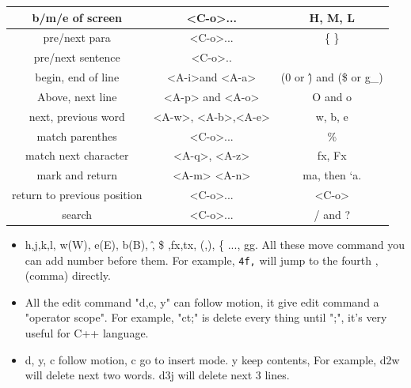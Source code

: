 \documentclass[a4paper,12pt,twoside]{book}
\begin{document}
\begin{itemize}
\begin{center}
\begin{tabular}{c|c|c}
	    \hline 
		b/m/e of screen & <C-o>... & H, M, L \\

		\hline 
		pre/next para & <C-o>... &\{ \} \\

		\hline 

		pre/next sentence & <C-o>.. & \( \) \\
		
		\hline 
		begin, end of line &<A-i>and <A-a> & (0 or \^) and (\$ or g\_)  \\
		

        \hline 
        Above, next line &<A-p> and <A-o> & O and o\\

	   	\hline 		
	     next, previous word &<A-w>, <A-b>,<A-e>  & w, b, e\\   
		 
         \hline 		
         match parenthes & <C-o>... & \%   \\
         
         \hline match next character &<A-q>, <A-z>& fx, Fx \\
         
        \hline mark and return & <A-m> <A-n> & ma, then `a. \\
        
        \hline return to previous position & <C-o>... & <C-o> \\    
      				
		\hline
        search &<C-o>...  & / and ? \\
       
\end{tabular}

\begin{itemize}


		\item h,j,k,l, w(W), e(E), b(B), \^ , \$ ,fx,tx, (,), \{ ..., gg. All these move command you can add number before them. For example, \verb=4f,= will jump to the fourth ,(comma) directly.    
		

				\item All the edit command "d,c, y" can follow motion, it give edit command a "operator scope". For example, "ct;" is delete every thing until ";", it's very useful for C++ language. 

				\item d, y, c follow motion, c go to insert mode. y keep contents, For example, d2w will delete next two words. d3j will delete next 3 lines.


\end{itemize}
\end{center}
\end{itemize}
\end{document}
